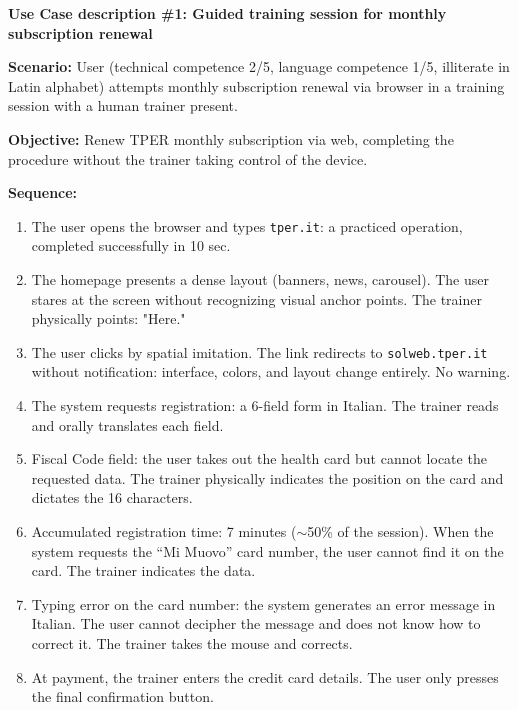 ﻿\documentclass[11pt,a4paper]{article}
\begin{document}
\begin{center}
\begin{tcolorbox}[sectionbox,colback=primaryColor!10]
    \textbf{Use Case description \#1: Guided training session for monthly subscription renewal}
\end{tcolorbox}

\vspace{0.3cm}

\begin{tcolorbox}[base]
    {\small
    \textbf{Scenario:} User (technical competence 2/5, language competence 1/5, illiterate in Latin alphabet) attempts monthly subscription renewal via browser in a training session with a human trainer present.

    \textbf{Objective:} Renew TPER monthly subscription via web, completing the procedure without the trainer taking control of the device.

    \textbf{Sequence:}
    \begin{enumerate}
        \item The user opens the browser and types \texttt{tper.it}: a practiced operation, completed successfully in 10 sec.
        \item The homepage presents a dense layout (banners, news, carousel). The user stares at the screen without recognizing visual anchor points. The trainer physically points: "Here."
        \item The user clicks by spatial imitation. The link redirects to \texttt{solweb.tper.it} without notification: interface, colors, and layout change entirely. No warning.
        \item The system requests registration: a 6-field form in Italian. The trainer reads and orally translates each field.
        \item Fiscal Code field: the user takes out the health card but cannot locate the requested data. The trainer physically indicates the position on the card and dictates the 16 characters.
        \item Accumulated registration time: 7 minutes ($\sim$50\% of the session). When the system requests the ``Mi Muovo'' card number, the user cannot find it on the card. The trainer indicates the data.
        \item Typing error on the card number: the system generates an error message in Italian. The user cannot decipher the message and does not know how to correct it. The trainer takes the mouse and corrects.
        \item At payment, the trainer enters the credit card details. The user only presses the final confirmation button.
    \end{enumerate}

}
\end{tcolorbox}
\end{center}
\end{document}
